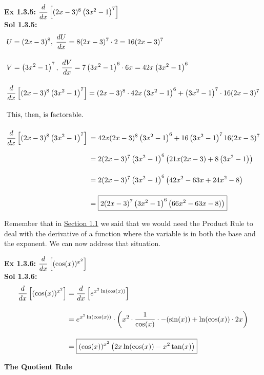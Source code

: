 \textbf{Ex 1.3.5: } $\dfrac{d}{dx} \left[(2x - 3)^8\left(3x^2 - 1\right)^7\right]$ \\[11pt]
\textbf{Sol 1.3.5: } \begin{align*}
    & U = (2x - 3)^8, \; \dfrac{dU}{dx} = 8(2x - 3)^7 \cdot 2 = 16(2x - 3)^7 \\[11pt]
    & V = \left(3x^2 - 1\right)^7, \; \dfrac{dV}{dx} = 7\left(3x^2 - 1\right)^6 \cdot 6x  = 42x\left(3x^2 - 1\right)^6\\[11pt]
    & \dfrac{d}{dx} \left[(2x - 3)^8\left(3x^2 - 1\right)^7\right] = (2x - 3)^8 \cdot 42x\left(3x^2 - 1\right)^6 + \left(3x^2 - 1\right)^7 \cdot 16(2x - 3)^7 \\[11pt]
    & \text{This, then, is factorable.} \\[11pt]
    & \dfrac{d}{dx} \left[(2x - 3)^8\left(3x^2 - 1\right)^7\right] \begin{aligned}[t]
        & = 42x(2x - 3)^8\left(3x^2 - 1\right)^6 + 16\left(3x^2 - 1\right)^7 16(2x - 3)^7 \\[11pt]
        & = 2(2x - 3)^7\left(3x^2 - 1\right)^6\left(21x(2x - 3) + 8\left(3x^2 - 1\right)\right) \\[11pt]
        & = 2(2x - 3)^7\left(3x^2 - 1\right)^6\left(42x^2 - 63x + 24x^2 - 8\right) \\[11pt]
        & = \boxed{2(2x - 3)^7\left(3x^2 - 1\right)^6\left(66x^2 - 63x - 8)\right)}
    \end{aligned}
\end{align*}

Remember that in \hyperlink{Section 1.1}{Section 1.1} we said that we would need the Product Rule to deal with the derivative of a function where the variable is in both the base and the exponent. We can now address that situation. \par

\textbf{Ex 1.3.6: } $\dfrac{d}{dx} \left[(\cos (x))^{x^2}\right]$ \\[11pt]
\textbf{Sol 1.3.6: } \begin{align*}
    \dfrac{d}{dx} \left[(\cos (x))^{x^2}\right] & = \dfrac{d}{dx} \left[e^{x^2\ln (\cos (x))}\right] \\[11pt]
    & = e^{x^2\ln (\cos (x))} \cdot \left(x^2 \cdot \dfrac{1}{\cos (x)} \cdot -(\sin (x)) + \ln (\cos (x)) \cdot 2x\right) \\[11pt]
    & = \boxed{(\cos (x))^{x^2}\left(2x\ln (\cos (x)) - x^2\tan (x)\right)}
\end{align*} 

\newpage

\textbf{\large{The Quotient Rule}}

